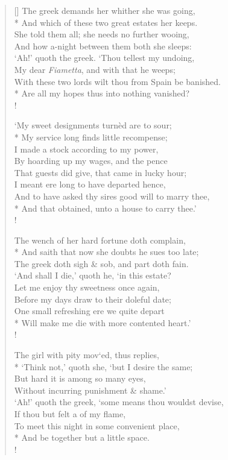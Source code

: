 \documentclass[MAIN]{subfiles}
\begin{document}
\begin{verse}[\versewidth]
The greek demands her whither she was going,\\*
\vin And which of these two great estates her keeps.\\
She told them all; she needs no further wooing,\\
\vin And how a-night between them both she sleeps:\\
`Ah!' quoth the greek. `Thou tellest my undoing,\\
\vin My dear \emph{Fiametta}, and with that he weeps;\\
With these two lords wilt thou from Spain be banished.\\*
Are all my hopes thus into nothing vanished?\\!

`My sweet designments turn\`ed are to sour;\\*
\vin My service long finds little recompense;\\
I made a stock according to my power,\\
\vin By hoarding up my wages, and the pence\\
That guests did give, that came in lucky hour;\\
\vin I meant ere long to have departed hence,\\
And to have asked thy sires good will to marry thee,\\*
And that obtained, unto a house to carry thee.'\\!

The wench of her hard fortune doth complain,\\*
\vin And saith that now she doubts he sues too late;\\
The greek doth sigh \& sob, and part doth fain.\\
\vin `And shall I die,' quoth he, `in this estate?\\
Let me enjoy thy sweetness once again,\\
\vin Before my days draw to their doleful date;\\
One small refreshing ere we quite depart\\*
Will make me die with more contented heart.'\\!

The girl with pity mov`ed, thus replies,\\*
\vin `Think not,' quoth she, `but I desire the same;\\
But hard it is among so many eyes,\\
\vin Without incurring punishment \& shame.'\\
`Ah!' quoth the greek, `some means thou wouldst devise,\\
\vin If thou but felt a  of my flame,\\
To meet this night in some convenient place,\\*
And be together but a little space.\\!


\end{verse}
\end{document}
